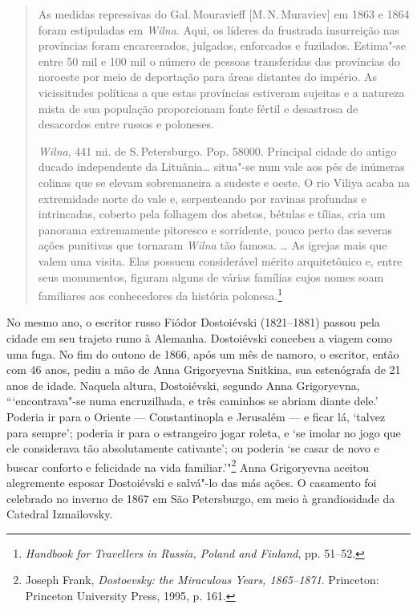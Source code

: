 \begin{quote}
As medidas repressivas do Gal.\,Mouravieff {[}M.\,N.\,Muraviev{]} em 1863 e
1864 foram estipuladas em \textit{Wilna}. Aqui, os líderes da frustrada
insurreição nas províncias foram encarcerados, julgados, enforcados e
fuzilados. Estima"-se entre 50 mil e 100 mil o número de pessoas
transferidas das províncias do noroeste por meio de deportação para
áreas distantes do império. As vicissitudes políticas a que estas
províncias estiveram sujeitas e a natureza mista de sua população
proporcionam fonte fértil e desastrosa de desacordos entre russos e
poloneses.

%

\textit{Wilna}, 441 mi. de S.\,Petersburgo. Pop. 58000. Principal cidade do antigo
ducado independente da Lituânia\ldots{} situa"-se num vale aos pés de
inúmeras colinas que se elevam sobremaneira a sudeste e oeste. O rio
Viliya acaba na extremidade norte do vale e, serpenteando por ravinas
profundas e intrincadas, coberto pela folhagem dos abetos, bétulas e
tílias, cria um panorama extremamente pitoresco e sorridente, pouco
perto das severas ações punitivas que tornaram \textit{Wilna} tão famosa.
\ldots{} As igrejas mais que valem uma visita. Elas possuem considerável
mérito arquitetônico e, entre seus monumentos, figuram alguns de várias
famílias cujos nomes soam familiares aos conhecedores da história
polonesa.\footnote{\textit{Handbook for Travellers in Russia, Poland and Finland}, pp. 51--52.} 
\end{quote}

No mesmo ano, o escritor russo Fiódor Dostoiévski (1821--1881) passou
pela cidade em seu trajeto rumo à Alemanha. Dostoiévski concebeu a
viagem como uma fuga. No fim do outono de 1866, após um mês de namoro, o
escritor, então com 46 anos, pediu a mão de Anna Grigoryevna Snitkina,
sua estenógrafa de 21 anos de idade. Naquela altura, Dostoiévski,
segundo Anna Grigoryevna, ```encontrava"-se numa encruzilhada, e três
caminhos se abriam diante dele.' Poderia ir para o Oriente ---
Constantinopla e Jerusalém --- e ficar lá, `talvez para sempre'; poderia
ir para o estrangeiro jogar roleta, e `se imolar no jogo que ele
considerava tão absolutamente cativante'; ou poderia `se casar de novo e
buscar conforto e felicidade na vida familiar.'"\footnote{Joseph Frank, \textit{Dostoevsky: the Miraculous Years, 1865--1871}. Princeton: Princeton University Press, 1995, p. 161.} Anna Grigoryevna aceitou alegremente esposar Dostoiévski e salvá"-lo das más ações. O casamento
foi celebrado no inverno de 1867 em São Petersburgo, em meio à
grandiosidade da Catedral Izmailovsky.

